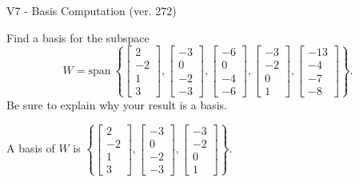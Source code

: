 \begin{exercise}
  \begin{exerciseTitle}V7 - Basis Computation (ver. 272)\end{exerciseTitle}
  \begin{exerciseStatement}
    Find a basis for the subspace 
\[W=\mathrm{span}\ \left\{\left[\begin{array}{r}
2 \\
-2 \\
1 \\
3
\end{array}\right] , \left[\begin{array}{r}
-3 \\
0 \\
-2 \\
-3
\end{array}\right] , \left[\begin{array}{r}
-6 \\
0 \\
-4 \\
-6
\end{array}\right] , \left[\begin{array}{r}
-3 \\
-2 \\
0 \\
1
\end{array}\right] , \left[\begin{array}{r}
-13 \\
-4 \\
-7 \\
-8
\end{array}\right]\right\}.\]
 Be sure to explain why your result is a basis.


  \end{exerciseStatement}
  \begin{exerciseAnswer}
   A basis of \(W\) is  \(\left\{\left[\begin{array}{r}
2 \\
-2 \\
1 \\
3
\end{array}\right] , \left[\begin{array}{r}
-3 \\
0 \\
-2 \\
-3
\end{array}\right] , \left[\begin{array}{r}
-3 \\
-2 \\
0 \\
1
\end{array}\right]\right\}\).
  


  \end{exerciseAnswer}
\end{exercise}